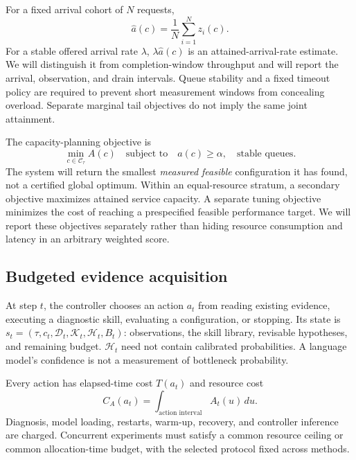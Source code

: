 \documentclass[11pt,a4paper]{article}
\begin{document}
For a fixed arrival cohort of $N$ requests,
\begin{equation}
 \widehat a(c)=\frac{1}{N}\sum_{i=1}^{N}z_i(c).
\end{equation}
For a stable offered arrival rate $\lambda$, $\lambda\widehat a(c)$ is an attained-arrival-rate estimate. We will distinguish it from completion-window throughput and will report the arrival, observation, and drain intervals. Queue stability and a fixed timeout policy are required to prevent short measurement windows from concealing overload. Separate marginal tail objectives do not imply the same joint attainment.

The capacity-planning objective is
\begin{equation}
 \min_{c\in\mathcal{C}_{\tau}} A(c)
 \quad\text{subject to}\quad
 a(c)\geq\alpha,\quad\text{stable queues}.
 \label{eq:capacity}
\end{equation}
The system will return the smallest \emph{measured feasible} configuration it has found, not a certified global optimum. Within an equal-resource stratum, a secondary objective maximizes attained service capacity. A separate tuning objective minimizes the cost of reaching a prespecified feasible performance target. We will report these objectives separately rather than hiding resource consumption and latency in an arbitrary weighted score.

\subsection{Budgeted evidence acquisition}
At step $t$, the controller chooses an action $a_t$ from reading existing evidence, executing a diagnostic skill, evaluating a configuration, or stopping. Its state is $s_t=(\tau,c_t,\mathcal{D}_t,\mathcal{K}_t,\mathcal{H}_t,B_t)$: observations, the skill library, revisable hypotheses, and remaining budget. $\mathcal{H}_t$ need not contain calibrated probabilities. A language model's confidence is not a measurement of bottleneck probability.

Every action has elapsed-time cost $T(a_t)$ and resource cost
\begin{equation}
 C_A(a_t)=\int_{\text{action interval}} A_t(u)\,du.
\end{equation}
Diagnosis, model loading, restarts, warm-up, recovery, and controller inference are charged. Concurrent experiments must satisfy a common resource ceiling or common allocation-time budget, with the selected protocol fixed across methods.
\end{document}
